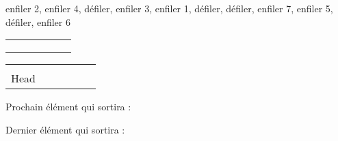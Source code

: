 \documentclass[11pt,a4paper]{article}
\begin{document}
\begin{center}

\begin{large}
enfiler 2, enfiler 4, défiler, enfiler 3, enfiler 1, défiler, défiler, enfiler 7, enfiler 5, défiler, enfiler 6
\end{large}

\bigskip

\begin{tabular}{ | C{1cm} | C{1cm} | C{1cm} | C{1cm} | C{1cm} | C{1cm} | }
  \hline
     &    &    &    &    &    \\
     &    &    &    &    &    \\
     &    &    &    &    &    \\
  \hline
\end{tabular}

\smallskip

\begin{tabular}{   C{1cm}   C{1cm}   C{1cm}   C{1cm}   C{1cm}   C{1cm}   }
   &  &  &  &  &  \\
  Head &  &  &  &  &  \\
\end{tabular}






\begin{table}[ht!]
  \begin{minipage}{0.50\textwidth}

Prochain élément qui sortira :

  \end{minipage}
  \hfillx
  \begin{minipage}{0.50\textwidth}

Dernier élément qui sortira :

  \end{minipage}
\end{table}
\end{center}
\end{document}
